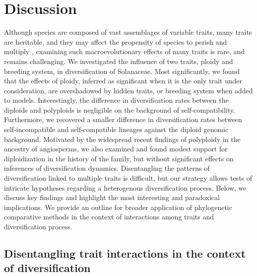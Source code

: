 \section{Discussion}

%
Although species are composed of vast assemblages of variable traits, many traits are heritable, and they may affect the propensity of species to perish and multiply \citep{lewontin_1970}, examining such macroevolutionary effects of many traits is rare, and remains challenging.
We investigated the influence of two traits, ploidy and breeding system, in diversification of Solanaceae.
Most significantly, we found that the effects of ploidy, inferred as significant when it is the only trait under consideration, are overshadowed by hidden traits, or breeding system when added to models.  
Interestingly, the difference in diversification rates between the diploids and polyploids is negligible on the background of self-compatibility.
Furthermore, we recovered a smaller difference in diversification rates between self-incompatible and self-compatible lineages against the diploid genomic background. 
Motivated by the widespread recent findings of polyploidy in the ancestry of angiosperms, we also examined and found modest support for diploidization in the history of the family, but without significant effects on inferences of diversification dynamics. %
Disentangling the patterns of diversification linked to multiple traits is difficult, but our strategy allows tests of intricate hypotheses regarding a heterogenous diversification process.
Below, we discuss key findings and highlight the most interesting and paradoxical implications.
We provide an outline for broader application of phylogenetic comparative methods in the context of interactions among traits and diversification process.

\subsection*{Disentangling trait interactions in the context of diversification} 

